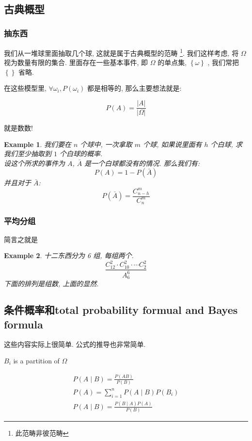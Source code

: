 \documentclass[a4paper, 10pt]{ctexart} %
\newtheorem{example}{\llap{$\rhd$ \space}Example}
\begin{document}
\subsection{古典概型}
\subsubsection{抽东西}
我们从一堆球里面抽取几个球, 这就是属于古典概型的范畴 \footnote{此范畴非彼范畴}. 我们这样考虑, 将 $\Omega$ 视为数量有限的集合.
里面存在一些基本事件, 即 $\Omega$ 的单点集, $\left\{\omega\right\}$ , 我们常把 $\left\{\right\}$ 省略. 

在这些模型里, $\forall \omega_{i}  , P\left(\omega_{i}\right)$ 都是相等的, 那么主要想法就是:

\begin{equation}
P\left(A\right) = \frac{\left| A \right| }{\left| \Omega \right| }
\end{equation}

就是数数! 

\begin{example}
    我们要在 $n$ 个球中, 一次拿取 $m$ 个球, 如果说里面有 $h$ 个白球, 求我们至少抽取到 $1$ 个白球的概率.\\
    设这个所求的事件为 $A$, $\bar A$ 是一个白球都没有的情况. 那么我们有:
    \[
    P\left(A\right)  = 1 - P\left(\bar A\right)
    \]
    并且对于 $\bar A$:
    \[
    P\left(\bar A\right) = \frac{C_{n-h}^{m}}{C_{n}^{m}}
    \]
\end{example}

\subsubsection{平均分组}
简言之就是
\begin{example}
    十二东西分为 6 组, 每组两个.
\begin{equation}
    \frac{
    C_{12} ^{2} \cdot  C_{10} ^{2} \cdot  \cdots  C_{2}^{2}
    }{A_{6}^{6}}
\end{equation}
下面的排列是组数, 上面的显然. 
\end{example}

\subsection{条件概率和total probability formual and Bayes formula}
这些内容实际上很简单. 公式的推导也非常简单. 

$B_{i}$ is a partition of $\Omega$

\begin{gather}
P\left(A \mid B\right) = \frac{P\left(AB\right)}{P\left(B\right)}\tag{条件概率}\\
P\left(A \right) = \sum_{i=1   }^{n} P\left(A \mid B\right) P\left(B_{i}\right)\tag{total probability}\\
P\left(A \mid B\right) = \frac{P\left(B \mid A\right) P\left(A\right)}{P\left(B\right)} \tag{Bayes formula}
\end{gather}
\end{document}

